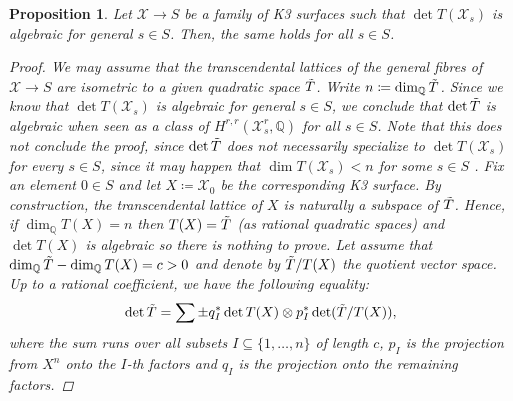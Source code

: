 \documentclass[11pt,twoside,a4paper]{amsart}
\newcommand{\0}{\mathscr{O}}
\newcommand{\Q}{\mathbb{Q}}
\newcommand{\T}{\Tilde{T}}
\newcommand{\X}{\mathscr{X}}
\theoremstyle{plain}
\newtheorem{prop}[thm]{Proposition}
\theoremstyle{definition}
\theoremstyle{remark}
\begin{document}
\begin{prop}
\label{Prop.: determinant is algebraic is a closed property in families}
Let $\X\rightarrow S$ be a family of K3 surfaces such that $\det T(\X_s)$ is algebraic for general $s\in S$. Then, the same holds for all $s\in S$.
\begin{proof}
We may assume that the transcendental lattices of the general fibres of $\X\rightarrow S$ are isometric to a given quadratic space $\Tilde{T}$. Write $n\coloneqq \dim_\Q \Tilde{T}$. Since we know that $\det T(\X_s)$ is algebraic for general $s\in S$, we conclude that $\det \T$ is algebraic when seen as a class of $H^{r,r}(\X_s^r,\Q)$ for all $s\in S$. Note that this does not conclude the proof, since $\det \Tilde{T}$ does not necessarily specialize to $\det T(\X_s)$ for every $s\in S$, since it may happen that $\dim T(\X_s)<n$ for some $s\in S$ . 
Fix an element $0\in S$ and let $X\coloneqq \X_0$ be the corresponding K3 surface. By construction, the transcendental lattice of $X$ is naturally a subspace of $\T$. Hence, if $\dim_\Q T(X)=n$ then $T(X)=\T$ (as rational quadratic spaces) and $\det T(X)$ is algebraic so there is nothing to prove. 
Let assume that $\dim_\Q \T-\dim_\Q T(X)=c>0$ and denote by $\T/T(X)$ the quotient vector space.
Up to a rational coefficient, we have the following equality:
\begin{equation}
    \label{eq.: determinant and quotient}
    \det \T=\sum\pm q_I^*\det T(X)\otimes p_I^* \det (\T/T(X)),
\end{equation}
where the sum runs over all subsets $I\subseteq \{1,\ldots,n\}$ of length $c$, $p_I$ is the projection from $X^n$ onto the $I$-th factors and $q_I$ is the projection onto the remaining factors.

\smallskip


\end{proof}
\end{prop}
\end{document}

